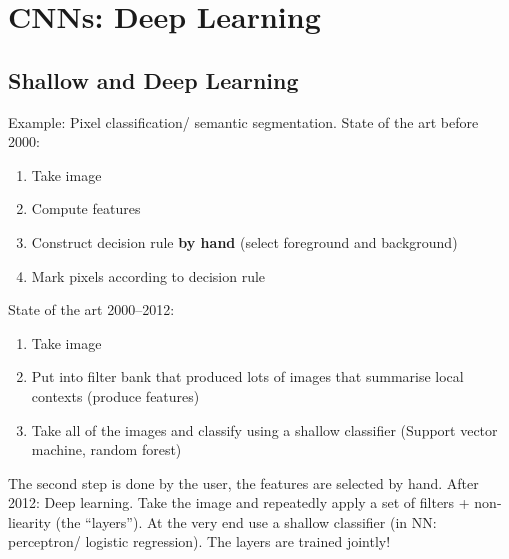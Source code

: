 \chapter{CNNs: Deep Learning}%
\label{chap:03}

\section{Shallow and Deep Learning}
Example: Pixel classification/ semantic segmentation. State of the art
before 2000:
\begin{enumerate}
\item Take image
\item Compute features
\item Construct decision rule \textbf{by hand} (\eg select foreground
  and background)
\item Mark pixels according to decision rule
\end{enumerate}

State of the art 2000--2012:
\begin{enumerate}
\item Take image
\item Put into filter bank that produced lots of images that summarise
  local contexts (\ie produce features)
\item Take all of the images and classify using a shallow classifier
  (Support vector machine, random forest)
\end{enumerate}
The second step is done by the user, \ie the features are selected by
hand. After 2012: Deep learning.  Take the image and repeatedly apply
a set of filters + non-liearity (the ``layers''). At the very end use
a shallow classifier (in NN: perceptron/ logistic regression). The
layers are trained jointly!

